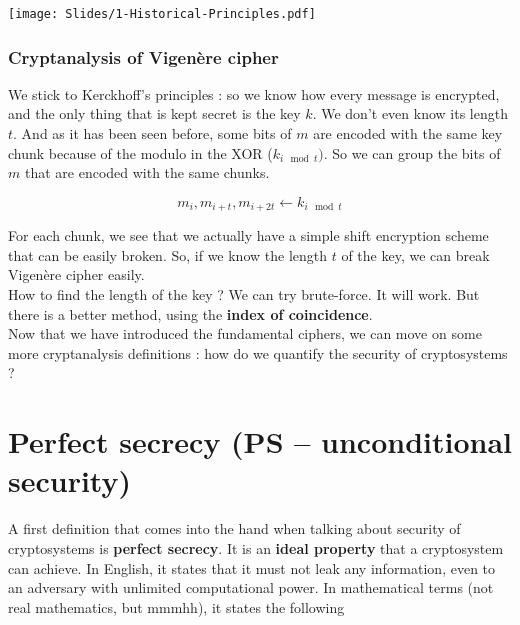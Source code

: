 \documentclass[../Cryptography.tex]{subfiles}
\begin{document}
\begin{center}
    \texttt{[image: Slides/1-Historical-Principles.pdf]}
\end{center}

\subsubsection{Cryptanalysis of Vigenère cipher}
We stick to Kerckhoff's principles : so we know how every message is encrypted, and the only thing that is kept secret is the key $k$. We don't even know its length $t$. And as it has been seen before, some bits of $m$ are encoded with the same key chunk because of the modulo in the XOR ($k_{i\mod t})$. So we can group the bits of $m$ that are encoded with the same chunks.

$$m_i, m_{i+ t}, m_{i+2t} \longleftarrow k_{i\mod t}$$

For each chunk, we see that we actually have a simple shift encryption scheme that can be easily broken. So, if we know the length $t$ of the key, we can break Vigenère cipher easily. \\

How to find the length of the key ? We can try brute-force. It will work. But there is a better method, using the \textbf{index of coincidence}. \\

Now that we have introduced the fundamental ciphers, we can move on some more cryptanalysis definitions : how do we quantify the security of cryptosystems ?


\section{Perfect secrecy (PS -- unconditional security)}
A first definition that comes into the hand when talking about security of cryptosystems is \textbf{perfect secrecy}. It is an \textbf{ideal property} that a cryptosystem can achieve. In English, it states that it must not leak any information, even to an adversary with unlimited computational power. In mathematical terms (not real mathematics, but mmmhh), it states the following 
\end{document}
